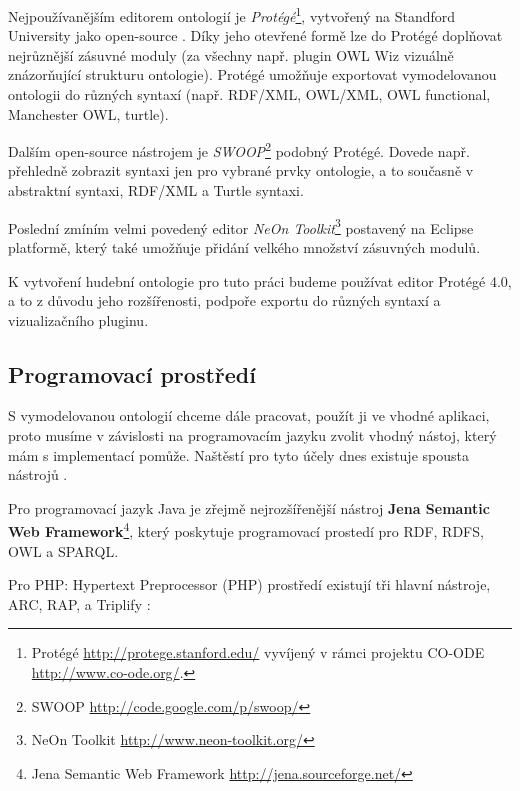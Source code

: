 Nejpoužívanějším editorem ontologií je \textit{Protégé}\footnote{Protégé \url{http://protege.stanford.edu/} vyvíjený v rámci projektu CO-ODE \url{http://www.co-ode.org/}.}, vytvořený na Standford University jako open-source \cite{owl2primer}.
Díky jeho otevřené formě lze do Protégé doplňovat nejrůznější zásuvné moduly (za všechny např. plugin OWL Wiz vizuálně znázorňující strukturu ontologie).
Protégé umožňuje exportovat vymodelovanou ontologii do různých syntaxí (např. RDF/XML, OWL/XML, OWL functional, Manchester OWL, turtle).

Dalším open-source nástrojem je \textit{SWOOP}\footnote{SWOOP \url{http://code.google.com/p/swoop/}} podobný Protégé. Dovede např. přehledně zobrazit syntaxi jen pro vybrané prvky ontologie, a to současně v abstraktní syntaxi, RDF/XML a Turtle syntaxi.

Poslední zmíním velmi povedený editor \textit{NeOn Toolkit}\footnote{NeOn Toolkit \url{http://www.neon-toolkit.org/}} postavený na Eclipse platformě, který také umožňuje přidání velkého množství zásuvných modulů.

K vytvoření hudební ontologie pro tuto práci budeme používat editor Protégé 4.0, a to z důvodu jeho rozšířenosti, podpoře exportu do různých syntaxí a vizualizačního pluginu.

\subsection{Programovací prostředí}

S vymodelovanou ontologií chceme dále pracovat, použít ji ve vhodné aplikaci, proto musíme v závislosti na programovacím jazyku zvolit vhodný nástoj, který mám s implementací pomůže. 
Naštěstí pro tyto účely dnes existuje spousta nástrojů \cite{semwebtools}.

Pro programovací jazyk Java je zřejmě nejrozšířenější nástroj \textbf{Jena Semantic Web Framework}\footnote{Jena Semantic Web Framework \url{http://jena.sourceforge.net/}}, který poskytuje programovací prostedí pro RDF, RDFS, OWL a SPARQL.

Pro PHP: Hypertext Preprocessor (PHP) prostředí existují tři hlavní nástroje, ARC, RAP, a Triplify \cite{semwebwikitools}:

